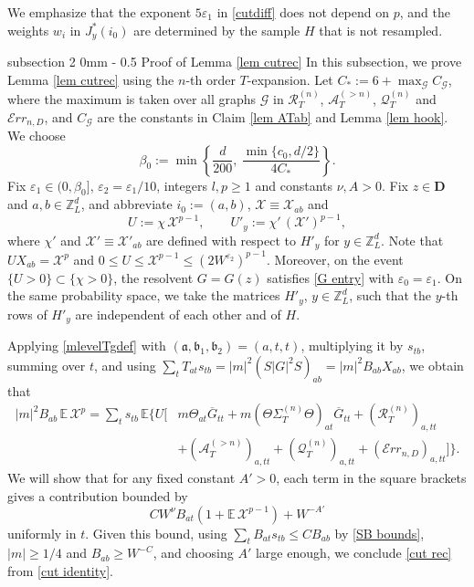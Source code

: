 \documentclass{article}
\makeatletter
\newcommand{\1}{\mathds{1}}
\numberwithin{equation}{section}
\newcommand{\be}{\begin{equation}}
\newcommand{\ee}{\end{equation}}
\newcommand{\e}{{\varepsilon}}
\newcommand{\fa}{{\mathfrak a}}
\newcommand{\fb}{{\mathfrak b}}
\renewcommand{\cal}{\mathcal}
\renewcommand{\leq}{\leqslant}
\renewcommand{\geq}{\geqslant}
\renewcommand{\le}{\leq}
\renewcommand{\ge}{\geq}
\newcommand{\E}{\mathbb{E}}
\newcommand{\Z}{\mathbb{Z}}
\theoremstyle{plain} %
\theoremstyle{remark}
\newcommand{\Sdelta}{{\Sigma}_T}
\newcommand{\PTn}{\mathcal R_T^{(n)}}
\newcommand{\QTn}{\mathcal Q_T^{(n)}}
\newcommand{\ATn}{\mathcal A_T^{(>n)}}
\newcommand{\Err}{{\mathcal Err}}
\renewcommand{\subsection}{\@startsection
	{subsection}%
	{2}%
	{0mm}%
	{-\baselineskip}%
	{0.5\baselineskip}%
	{\normalfont\bf\itshape}} %
\makeatother
\begin{document}
We emphasize that the exponent $5\e_1$ in \eqref{cutdiff} does not depend on $p$, and the weights $w_i$ in $J^*_y(i_0)$ are determined by the sample $H$ that is not resampled.

\subsection{Proof of Lemma \ref{lem cutrec}} \label{sec_pfp1}
In this subsection, we prove Lemma \ref{lem cutrec} using the $n$-th order $T$-expansion. Let $C_*:=6+\max_{\cal G}C_{\cal G}$, where the maximum is taken over all graphs $\cal G$ in $\PTn$, $\ATn$, $\QTn$ and $\Err_{n,D}$, and $C_{\cal G}$ are the constants in Claim \ref{lem ATab} and Lemma \ref{lem hook}. We choose
\be\label{choice beta0}
\beta_0:=\min\left\{\frac{d}{200},\ \frac{\min\{c_0,d/2\}}{4C_*}\right\}.
\ee
Fix $\e_1\in(0,\beta_0]$, $\e_2=\e_1/10$, integers $l,p\ge 1$ and constants $\nu,A>0$. Fix $z\in \mathbf D$ and $a,b\in\Z_L^d$, and abbreviate $i_0:=(a,b)$, $\cal X\equiv\cal X_{ab}$ and
$$U:=\chi\,\cal X^{p-1},\qquad U'_y:=\chi'\,(\cal X')^{p-1},$$
where $\chi'$ and $\cal X'\equiv \cal X'_{ab}$ are defined with respect to $H'_y$ for $y\in\Z_L^d$. Note that $U X_{ab}=\cal X^p$ and $0\le U\le \cal X^{p-1}\le (2W^{\e_2})^{p-1}$. Moreover, on the event $\{U>0\}\subset\{\chi>0\}$, the resolvent $G=G(z)$ satisfies \eqref{G entry} with $\e_0=\e_1$. On the same probability space, we take the matrices $H'_y$, $y\in \Z_L^d$, such that the $y$-th rows of $H'_y$ are independent of each other and of $H$.

\medskip
{} Applying \eqref{mlevelTgdef} with $(\fa,\fb_1,\fb_2)=(a,t,t)$, multiplying it by $s_{tb}$, summing over $t$, and using $\sum_tT_{at}s_{tb}=|m|^2(S|G|^2S)_{ab}=|m|^2B_{ab}X_{ab}$, we obtain that
\be\label{cut identity}
\begin{split}
|m|^2B_{ab}\,\E\,\cal X^p=\sum_ts_{tb}\,\E\Big\{U\Big[&m\Theta_{at}\overline G_{tt}+m(\Theta\Sdelta^{(n)}\Theta)_{at}\overline G_{tt}+(\PTn)_{a,tt}\\
&+(\ATn)_{a,tt}+(\QTn)_{a,tt}+(\Err_{n,D})_{a,tt}\Big]\Big\}.
\end{split}
\ee
We will show that for any fixed constant $A'>0$, each term in the square brackets gives a contribution bounded by
\be\label{cut each}
CW^{\nu}B_{at}\left(1+\E\,\cal X^{p-1}\right)+W^{-A'}
\ee
uniformly in $t$. Given this bound, using $\sum_tB_{at}s_{tb}\le CB_{ab}$ by \eqref{SB bounds}, $|m|\ge 1/4$ and $B_{ab}\ge W^{-C}$, and choosing $A'$ large enough, we conclude \eqref{cut rec} from \eqref{cut identity}.
\end{document}
